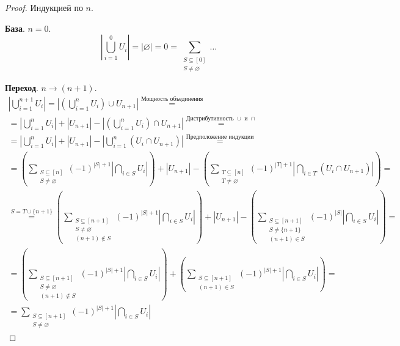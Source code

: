 \begin{proof}
  Индукцией по $n$.

  \textbf{База}. $n=0$.
  \[
    \left|\bigcup_{i=1}^0 U_i\right| = |\varnothing| = 0
    = \sum_{\substack{S\subseteq[0]\\ S\ne\varnothing}}\ldots
  \]

  \textbf{Переход}. $n\to(n+1)$.
  \begin{multline*}
    \left|\bigcup_{i=1}^{n+1}U_i\right|
    = \left|\left(\bigcup_{i=1}^n U_i\right)\cup U_{n+1}\right|
    \stackrel{\text{Мощность объединения}}{=}
    \\=\left|\bigcup_{i=1}^n U_i\right|+\left|U_{n+1}\right|
    - \left|\left(\bigcup_{i=1}^n U_i\right)\cap U_{n+1}\right|
    \stackrel{\text{Дистрибутивность $\cup$ и $\cap$}}{=}
    \\=\left|\bigcup_{i=1}^n U_i\right|+\left|U_{n+1}\right|
    - \left|\bigcup_{i=1}^n\left(U_i\cap U_{n+1}\right)\right|
    \stackrel{\text{Предположение индукции}}{=}
    \\=\left(\sum_{\substack{S\subseteq[n]\\ S\ne\varnothing}}(-1)^{|S|+1}
    \left|\bigcap_{i\in S}U_i\right|\right)+\left|U_{n+1}\right|
    -\left(\sum_{\substack{T\subseteq[n]\\ T\ne\varnothing}}(-1)^{|T|+1}
    \left|\bigcap_{i\in T}\left(U_i\cap U_{n+1}\right)\right|\right)
    =\\\stackrel{S=T\cup\{n+1\}}{=}
    \left(\sum_{\substack{S\subseteq[n+1]\\ S\ne\varnothing\\ (n+1)\not\in S}}
    (-1)^{|S|+1}\left|\bigcap_{i\in S} U_i\right|\right)+\left|U_{n+1}\right|
    -\left(\sum_{\substack{S\subseteq[n+1]\\ S\ne\{n+1\}\\ (n+1)\in S}}
    (-1)^{|S|}\left|\bigcap_{i\in S} U_i\right|\right)
    =\\=
    \left(\sum_{\substack{S\subseteq[n+1]\\ S\ne\varnothing\\ (n+1)\not\in S}}
    (-1)^{|S|+1}\left|\bigcap_{i\in S} U_i\right|\right)
    +\left(\sum_{\substack{S\subseteq[n+1]\\ (n+1)\in S}}
    (-1)^{|S|+1}\left|\bigcap_{i\in S} U_i\right|\right)
    =\\=
    \sum_{\substack{S\subseteq[n+1]\\ S\ne\varnothing}}(-1)^{|S|+1}
    \left|\bigcap_{i\in S}U_i\right|
  \end{multline*}
\end{proof}
